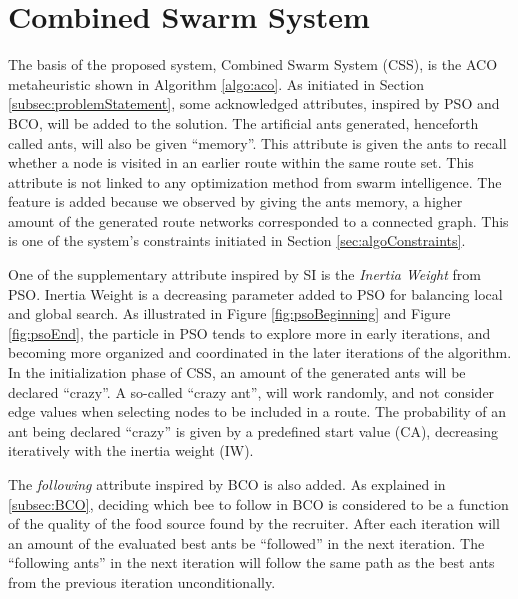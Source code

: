 \section{Combined Swarm System}
\label{section:methodDescription}

The basis of the proposed system, Combined Swarm System (CSS), is the ACO metaheuristic shown in Algorithm \vref{algo:aco}. As initiated in Section \vref{subsec:problemStatement}, some acknowledged attributes, inspired by PSO and BCO, will be added to the solution. The artificial ants generated, henceforth called ants, will also be given ``memory''. This attribute is given the ants to recall whether a node is visited in an earlier route within the same route set.  This attribute is not linked to any optimization method from swarm intelligence. The feature is added because we observed by giving the ants memory, a higher amount of the generated route networks corresponded to a connected graph. This is one of the system's constraints initiated in Section \vref{sec:algoConstraints}.

One of the supplementary attribute inspired by SI is the \textit{Inertia Weight} from PSO. Inertia Weight is a decreasing parameter added to PSO for balancing local and global search. As illustrated in Figure \vref{fig:psoBeginning} and Figure \vref{fig:psoEnd}, the particle in PSO tends to explore more in early iterations, and becoming more organized and coordinated in the later iterations of the algorithm. In the initialization phase of CSS, an amount of the generated ants will be declared ``crazy''. A so-called ``crazy ant'', will work randomly, and not consider edge values when selecting nodes to be included in a route. The probability of an ant being declared ``crazy'' is given by a predefined start value (CA), decreasing iteratively with the inertia weight (IW).

The \textit{following} attribute inspired by BCO is also added. As explained in \vref{subsec:BCO}, deciding which bee to follow in BCO is considered to be a function of the quality of the food source found by the recruiter. After each iteration will an amount of the evaluated best ants be ``followed'' in the next iteration. The ``following ants'' in the next iteration will follow the same path as the best ants from the previous iteration unconditionally. 




